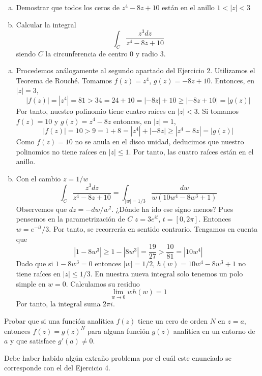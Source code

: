\documentclass[twoside]{article}
\begin{document}
\begin{ejercicio}{7}
\begin{enumerate}[(a)]
\item Demostrar que todos los ceros de $z^4-8z+10$ están en el anillo $1<|z|<3$
\item Calcular la integral $$\int_C \frac{z^3dz}{z^4-8z+10}$$
siendo $C$ la circunferencia de centro $0$ y radio $3$.
\end{enumerate}
\end{ejercicio}
\begin{solucion}
\begin{enumerate}[(a)]
\item Procedemos análogamente al segundo apartado del Ejercicio 2. Utilizamos el Teorema de Rouché. Tomamos $f(z)=z^4$, $g(z)=-8z+10$. Entonces, en $|z|=3$,
$$
|f(z)|=|z^4| = 81 > 34 = 24 + 10 = |-8z|+10 \geq |-8z+10| = |g(z)|
$$
Por tanto, nuestro polinomio tiene cuatro raíces en $|z|<3$. Si tomamos $f(z)=10$ y $g(z)=z^4-8z$ entonces, en $|z|=1$,
$$
|f(z)| = 10 > 9 = 1+8 = |z^4|+|-8z| \geq |z^4-8z| =|g(z)|
$$
Como $f(z)=10$ no se anula en el disco unidad, deducimos que nuestro polinomios no tiene raíces en $|z|\leq 1$. Por tanto, las cuatro raíces están en el anillo. 
\item Con el cambio $z=1/w$
$$
\int_C \frac{z^3dz}{z^4-8z+10} = \int_{|w|=1/3} \frac{dw}{w(10w^4-8w^3+1)}
$$
Observemos que $dz = -dw/w^2$. ¿Dónde ha ido ese signo menos? Pues pensemos en la parametrización de $C$ $z=3e^{it}$, $t=[0,2\pi]$. Entonces $w=e^{-it}/3$. Por tanto, se recorrería en sentido contrario. Tengamos en cuenta que 
$$
|1-8w^3| \geq 1-|8w^3| = \frac{19}{27} > \frac{10}{81} = |10w^4|
$$
Dado que si $1-8w^3=0$ entonces $|w|=1/2$, $h(w)=10w^4-8w^3+1$ no tiene raíces en $|z|\leq 1/3$. En nuestra nueva integral solo tenemos un polo simple en $w=0$. Calculamos su residuo
$$
\lim_{w\to 0}wh(w) = 1
$$
Por tanto, la integral suma $2\pi i$.
\end{enumerate}
\end{solucion}
\newpage

\begin{ejercicio}{8}

\end{ejercicio}
\begin{solucion}

\end{solucion}
\newpage


\begin{ejercicio}{9}
Probar que si una función analítica $f(z)$ tiene un cero de orden $N$ en $z=a$, entonces $f(z)=g(z)^N$ para alguna función $g(z)$ analítica en un entorno de $a$ y que satisface $g'(a)\neq 0$.
\end{ejercicio}
\begin{solucion}
Debe haber habido algún extraño problema por el cuál este enunciado se corresponde con el del Ejercicio 4.
\end{solucion}
\newpage
\end{document}
